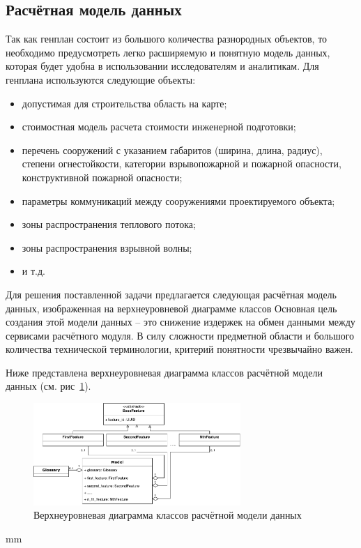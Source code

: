 \subsection{\large{Расчётная модель данных}}

Так как генплан состоит из большого количества разнородных объектов,
то необходимо предусмотреть легко расширяемую и понятную модель данных,
которая будет удобна в использовании исследователям и аналитикам.
Для генплана используются следующие объекты:
\begin{itemize}
    \item допустимая для строительства область на карте;
    \item стоимостная модель расчета стоимости инженерной подготовки;
    \item перечень сооружений с указанием габаритов (ширина, длина, радиус),
    степени огнестойкости, категории взрывопожарной и пожарной опасности, конструктивной пожарной опасности;
    \item параметры коммуникаций между сооружениями проектируемого объекта;
    \item зоны распространения теплового потока;
    \item зоны распространения взрывной волны;
	\item и т.д.
\end{itemize}

Для решения поставленной задачи предлагается следующая расчётная модель данных, изображенная
на верхнеуровневой диаграмме классов
Основная цель создания этой модели данных -- это снижение издержек на обмен данными между
сервисами расчётного модуля.
В силу сложности предметной области и большого количества технической терминологии,
критерий понятности чрезвычайно важен.

Ниже представлена верхнеуровневая диаграмма классов расчётной модели данных
(см. рис\ \ref{pic:architecture__model-classes}).

\begin{figure}[H]
	\hspace*{-2.5 cm}\includegraphics[width=0.7\textwidth, left]{architecture/pictures/model/classes}
	\caption{Верхнеуровневая диаграмма классов расчётной модели данных}
	\label{pic:architecture__model-classes}
\end{figure}
 mm

